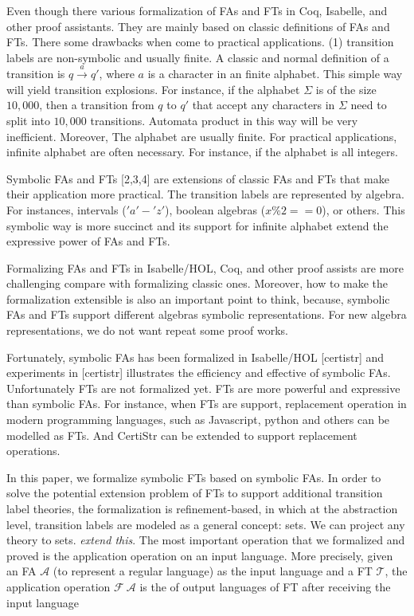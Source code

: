 \documentclass[a4paper,UKenglish,cleveref, autoref, thm-restate]{lipics-v2021}
\begin{document}
Even though there various  formalization of FAs and FTs in Coq, Isabelle, and other proof assistants. They are mainly based on classic definitions of FAs and FTs.  There some drawbacks when come to practical applications. (1) transition labels are 
non-symbolic and usually finite.
A classic and normal definition of a transition is $q\xrightarrow{a}q'$, where $a$ is a character in an finite alphabet.  This simple way will yield transition explosions. 
For instance, if the alphabet $\Sigma$ is of the size $10,000$, then a transition from $q$ to $q'$ that accept any characters in $\Sigma$ need to split into $10,000$ transitions. Automata product in this way will be very inefficient. Moreover, 
The alphabet are usually finite. For practical applications, infinite alphabet are often necessary. For instance, if the alphabet is all integers. 


Symbolic FAs and FTs [2,3,4] are extensions of classic FAs and FTs that make their application more practical. The transition labels are represented by algebra. For instances, intervals ($'a'-'z'$), boolean algebras ($x \% 2 == 0$), or others. This symbolic way is more succinct and its support for infinite alphabet extend the expressive power of FAs and FTs.

Formalizing FAs and FTs in Isabelle/HOL, Coq, and other proof assists are more challenging compare with formalizing classic ones. Moreover, how to make the formalization extensible is also an important point to think, because, symbolic FAs and FTs support different algebras symbolic representations. For new algebra representations, we do not want repeat some proof works.


Fortunately, symbolic FAs has been formalized in Isabelle/HOL [certistr] and experiments in [certistr] illustrates the efficiency and effective of symbolic FAs. Unfortunately FTs are not formalized yet.  FTs are more powerful and expressive than symbolic FAs. For instance, when FTs are support, replacement operation in modern programming languages, such as Javascript, python and others can be modelled as FTs. And CertiStr can be extended to support replacement operations.

In this paper, we formalize symbolic FTs based on symbolic FAs. In order to solve the potential extension problem of FTs to support additional transition label theories, the formalization is refinement-based, in which at the abstraction level, transition labels are modeled as a general concept: sets. We can project any theory to sets. \emph{extend this}.
The most important operation that we formalized and proved is the application operation on an input language.  More precisely, given an FA $\mathcal{A}$ (to represent a regular language) as the input language and a FT $\mathcal{T}$, the application operation $\mathcal{F}~\mathcal{A}$ is the  of output languages of FT after receiving the input language 
\end{document}
